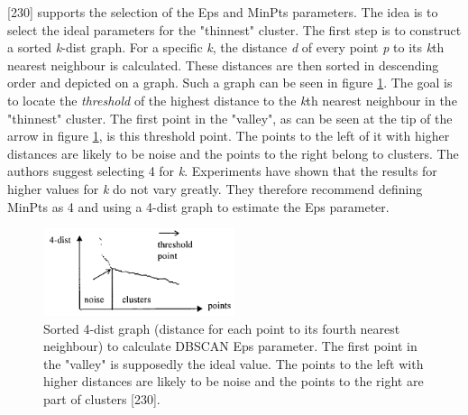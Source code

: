 \textcite{DBSCAN}[230] supports the selection of the Eps and MinPts parameters. The idea is to select the ideal parameters for the "thinnest" cluster. The first step is to construct a sorted \textit{k}-dist graph. For a specific \textit{k}, the distance \textit{d} of every point \textit{p} to its \textit{k}th nearest neighbour is calculated. These distances are then sorted in descending order and depicted on a graph. Such a graph can be seen in figure \ref{figure:sortedKGraphDBSCAN}. The goal is to locate the \textit{threshold} of the highest distance to the \textit{k}th nearest neighbour in the "thinnest" cluster. The first point in the "valley", as can be seen at the tip of the arrow in figure \ref{figure:sortedKGraphDBSCAN}, is this threshold point. The points to the left of it with higher distances are likely to be noise and the points to the right belong to clusters. The authors suggest selecting 4 for \textit{k}. Experiments have shown that the results for higher values for \textit{k} do not vary greatly. They therefore recommend defining MinPts as 4 and using a 4-dist graph to estimate the Eps parameter.


\begin{figure}[h]
  \centering
  \includegraphics[width=0.5\textwidth]{./images/sortedKGraphDBSCAN.png}
  \caption{Sorted 4-dist graph (distance for each point to its fourth nearest neighbour) to calculate DBSCAN Eps parameter. The first point in the "valley" is supposedly the ideal value. The points to the left with higher distances are likely to be noise and the points to the right are part of clusters \autocite{DBSCAN}[230].}
  \label{figure:sortedKGraphDBSCAN}
\end{figure}


